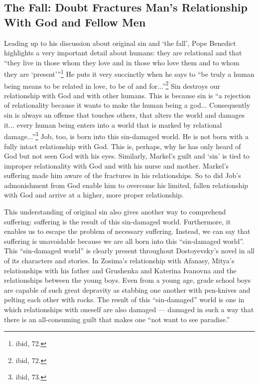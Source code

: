 \subsection{The Fall: Doubt Fractures Man's Relationship With God and Fellow Men}
Leading up to his discussion about original sin and `the fall', Pope Benedict highlights a very important detail about humans: they are relational and that ``they live in those whom they love and in those who love them and to whom they are `present'''\footnote{ibid, 72.} He puts it very succinctly when he says to ``be truly a human being means to be related in love, to be of and for...''\footnote{ibid, 72.} Sin destroys our relationship with God and with other humans. This is because sin is ``a rejection of relationality because it wants to make the human being a god... Consequently sin is always an offense that touches others, that alters the world and damages it... every human being enters into a world that is marked by relational damage...''\footnote{ibid, 73.} Job, too, is born into this sin-damaged world. He is not born with a fully intact relationship with God. This is, perhaps, why he has only heard of God but not seen God with his eyes. Similarly, Markel's guilt and `sin' is tied to improper relationality with God and with his nurse and mother. Markel's suffering made him aware of the fractures in his relationships. So to did Job's admonishment from God enable him to overcome his limited, fallen relationship with God and arrive at a higher, more proper relationship. 

This understanding of original sin also gives another way to comprehend suffering: suffering is the result of this sin-damaged world. Furthermore, it enables us to escape the problem of necessary suffering. Instead, we can say that suffering is unavoidable because we are all born into this ``sin-damaged world''. This ``sin-damaged world'' is clearly present throughout Dostoyevsky's novel in all of its characters and stories. In Zosima's relationship with Afanasy, Mitya's relationships with his father and Grushenka and Katerina Ivanovna and the relationships between the young boys. Even from a young age, grade school boys are capable of such great depravity as stabbing one another with pen-knives and pelting each other with rocks. The result of this ``sin-damaged'' world is one in which relationships with oneself are also damaged --- damaged in such a way that there is an all-consuming guilt that makes one ``not want to see paradise.''

